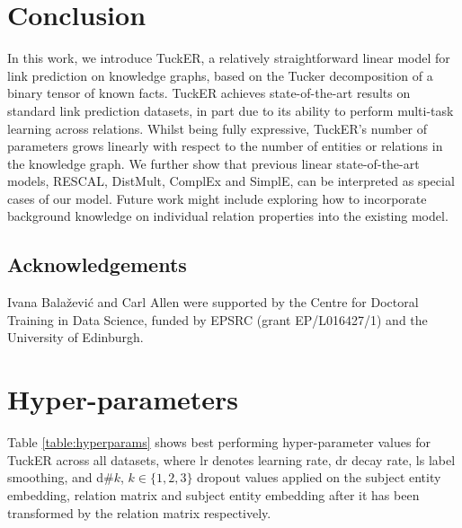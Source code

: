 \documentclass[11pt,a4paper]{article}
\begin{document}
\section{Conclusion}
\vspace{-0.1cm}

In this work, we introduce TuckER, a relatively straightforward linear model for link prediction on knowledge graphs, based on the Tucker decomposition of a binary tensor of known facts. TuckER achieves state-of-the-art results on standard link prediction datasets, in part due to its ability to perform multi-task learning across relations. Whilst being fully expressive, TuckER's number of parameters grows linearly with respect to the number of entities or relations in the knowledge graph. We further show that previous linear state-of-the-art models, RESCAL, DistMult, ComplEx and SimplE, can be interpreted as special cases of our model. Future work might include exploring how to incorporate background knowledge on individual relation properties into the existing model.

\subsection*{Acknowledgements}
Ivana Bala\v{z}evi\'c and Carl Allen were supported by the Centre for Doctoral Training in Data Science, funded by EPSRC (grant EP/L016427/1) and the University of Edinburgh.





\clearpage
\appendix

\section{Hyper-parameters}
\label{sec:hyperparams}

Table \ref{table:hyperparams} shows best performing hyper-parameter values for TuckER across all datasets, where lr denotes learning rate, dr decay rate, ls label smoothing, and d\#$k$, $k \in \{1, 2, 3\}$ dropout values applied on the subject entity embedding, relation matrix and subject entity embedding after it has been transformed by the relation matrix respectively.

\begin{table}[!htbp]
\centering
{}
  \caption{Best performing hyper-parameter values for TuckER across all datasets.}
    \label{table:hyperparams}
\end{table}
\end{document}

